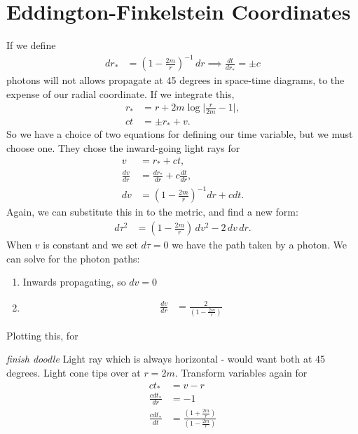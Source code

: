 \documentclass[a4paper, 11pt, normalem]{report}
\begin{document}
\section{Eddington-Finkelstein Coordinates}
If we define
\begin{align}
    dr_{*} &= \left(1-\frac{2m}{r}\right)^{-1}\,dr \implies \frac{dt}{dr_{*}} = \pm c
\end{align}
photons will not allows propagate at 45 degrees in space-time diagrams, to the expense of our radial coordinate.
If we integrate this,
\begin{align}
    r_{*} &= r + 2m\log\bigg|\frac{r}{2m}-1\bigg|, \\
    ct &= \pm r_{*} + v.
\end{align}
So we have a choice of two equations for defining our time variable, but we must choose one.
They chose the inward-going light rays for
\begin{align}
    v &= r_{*} + ct, \\
    \frac{dv}{dr} &= \frac{dr_{*}}{dr} + c\frac{dt}{dr}, \\
    dv &= \left(1-\frac{2m}{r}\right)^{-1}dr + cdt.
\end{align}
Again, we can substitute this in to the metric, and find a new form:
\begin{align}
    d\tau^2 &= \left(1-\frac{2m}{r}\right)\,dv^2 - 2\,dv\,dr.
\end{align}
When $v$ is constant and we set $d\tau=0$ we have the path taken by a photon.
We can solve for the photon paths:
\begin{enumerate}
    \item Inwards propagating, so $dv = 0$
    \item
        \begin{align}
            \frac{dv}{dr} &= \frac{2}{\left(1-\frac{2m}{r}\right)}
        \end{align}
\end{enumerate}
Plotting this, for
\begin{figure}[H]
    \centering
\end{figure}
\emph{finish doodle}
Light ray which is always horizontal - would want both at 45 degrees.
Light cone tips over at $r=2m$.
Transform variables again for
\begin{align}
    ct_{*} &= v-r \\
    \frac{cdt_{*}}{dr} &= -1 \\
    \frac{cdt_{*}}{dt} &= \frac{\left(1+\frac{2m}{r}\right)}{\left(1-\frac{2m}{r}\right)}
\end{align}
\end{document}
